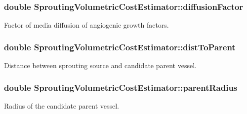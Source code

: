 \subsubsection[{\texorpdfstring{diffusion\+Factor}{diffusionFactor}}]{\setlength{\rightskip}{0pt plus 5cm}double Sprouting\+Volumetric\+Cost\+Estimator\+::diffusion\+Factor\hspace{0.3cm}{\ttfamily [private]}}\hypertarget{class_sprouting_volumetric_cost_estimator_afe49d902defafd1c47bd5c0ac39580cf}{}\label{class_sprouting_volumetric_cost_estimator_afe49d902defafd1c47bd5c0ac39580cf}
Factor of media diffusion of angiogenic growth factors. 
\subsubsection[{\texorpdfstring{dist\+To\+Parent}{distToParent}}]{\setlength{\rightskip}{0pt plus 5cm}double Sprouting\+Volumetric\+Cost\+Estimator\+::dist\+To\+Parent\hspace{0.3cm}{\ttfamily [private]}}\hypertarget{class_sprouting_volumetric_cost_estimator_af607b0ebd1aad6a5106c24cbd4452bd5}{}\label{class_sprouting_volumetric_cost_estimator_af607b0ebd1aad6a5106c24cbd4452bd5}
Distance between sprouting source and candidate parent vessel. 
\subsubsection[{\texorpdfstring{parent\+Radius}{parentRadius}}]{\setlength{\rightskip}{0pt plus 5cm}double Sprouting\+Volumetric\+Cost\+Estimator\+::parent\+Radius\hspace{0.3cm}{\ttfamily [private]}}\hypertarget{class_sprouting_volumetric_cost_estimator_a4244e87579d0ff6b989ef221fff16187}{}\label{class_sprouting_volumetric_cost_estimator_a4244e87579d0ff6b989ef221fff16187}
Radius of the candidate parent vessel. 
